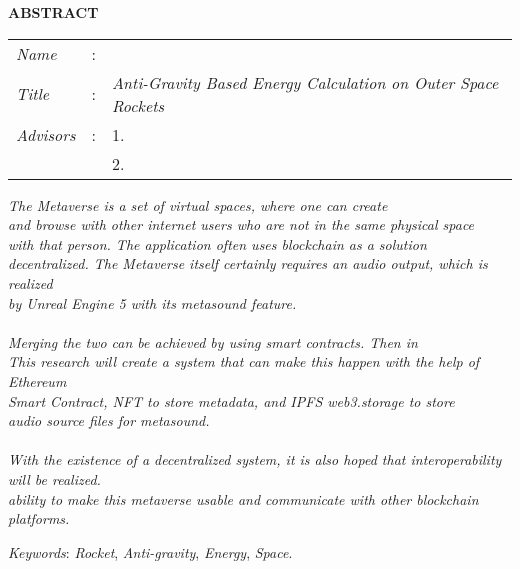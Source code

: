 \begin{center}
  \large\textbf{ABSTRACT}
\end{center}


\vspace{2ex}

\begingroup
\setlength{\tabcolsep}{0pt}

\noindent
\begin{tabularx}{\textwidth}{l >{\centering}m{3em} X}
  \emph{Name}     & : & \name{}                                                             \\

  \emph{Title}    & : & \emph{Anti-Gravity Based Energy Calculation on Outer Space Rockets} \\

  \emph{Advisors} & : & 1. \advisor{}                                                       \\
                  &   & 2. \coadvisor{}                                                     \\
\end{tabularx}
\endgroup

\emph{The Metaverse is a set of virtual spaces, where one can create\\
  and browse with other internet users who are not in the same physical space\\
  with that person. The application often uses blockchain as a solution\\
  decentralized. The Metaverse itself certainly requires an audio output, which is realized\\
  by Unreal Engine 5 with its metasound feature.\\
  \\
  Merging the two can be achieved by using smart contracts. Then in\\
  This research will create a system that can make this happen with the help of Ethereum\\
  Smart Contract, NFT to store metadata, and IPFS web3.storage to store\\
  audio source files for metasound.\\
  \\
  With the existence of a decentralized system, it is also hoped that interoperability will be realized.\\
  ability to make this metaverse usable and communicate with other blockchain platforms.}

\emph{Keywords}: \emph{Rocket}, \emph{Anti-gravity}, \emph{Energy}, \emph{Space}.
